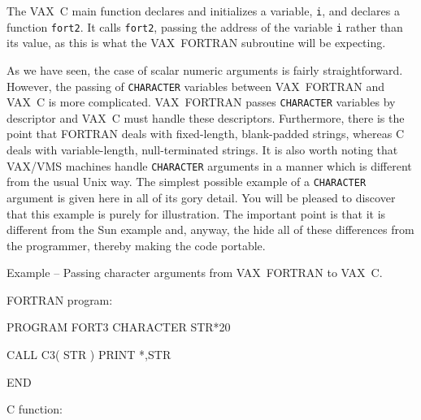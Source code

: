 \documentclass[twoside,11pt,nolof]{starlink}
\newcounter{examples}
\begin{document}
The VAX~C main function declares and initializes a variable, \texttt{i}, and
declares a function \texttt{fort2}.
It calls \texttt{fort2}, passing the address of the variable \texttt{i} rather
than its value, as this is what the VAX~FORTRAN subroutine will be expecting.

As we have seen, the case of scalar numeric arguments is fairly
straightforward.
However, the passing of \texttt{CHARACTER} variables between VAX~FORTRAN
and VAX~C is more complicated. VAX~FORTRAN passes \texttt{CHARACTER} variables
by descriptor and VAX~C must handle these descriptors.
Furthermore, there is the point that FORTRAN deals with fixed-length,
blank-padded strings, whereas C deals with variable-length, null-terminated
strings. It is also worth noting that VAX/VMS machines handle
\texttt{CHARACTER} arguments in a manner which is different from the usual Unix
way.
The simplest possible example of a \texttt{CHARACTER} argument is given here
in all of its gory detail.
You will be pleased to discover that this example is purely for illustration.
The important point is that it is different from the Sun example and, anyway,
the
 hide all of these
differences from the programmer, thereby making the code portable.

\label{vms_char}
\begin{center}
Example\latex{~\ref{vms_char}}
-- Passing character arguments from VAX~FORTRAN to
VAX~C\@.
\end{center}
\nopagebreak[4]
FORTRAN program:
\nopagebreak[4]
\begin{small}
\begin{terminalv}
      PROGRAM FORT3
      CHARACTER STR*20

      CALL C3( STR )
      PRINT *,STR

      END
\end{terminalv}
\end{small}
\pagebreak[1]
C function:
\nopagebreak[4]
\begin{small}
\end{small}
\end{document}
